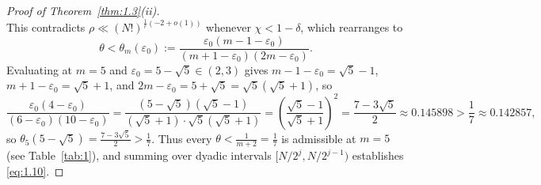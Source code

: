 \documentclass[11pt,reqno]{amsart}
\theoremstyle{remark}
\numberwithin{equation}{section}
\begin{document}
\begin{proof}[Proof of Theorem~\ref{thm:1.3}(ii)]
\[\]
This contradicts $\rho \ll (N!)^{\frac{1}{r}(-2+o(1))}$ whenever $\chi < 1 - \delta$, which rearranges to
\begin{equation}\label{eq:7.18}
\theta < \theta_m(\varepsilon_0) := \frac{\varepsilon_0(m - 1 - \varepsilon_0)}{(m + 1 - \varepsilon_0)(2m - \varepsilon_0)}.
\end{equation}
Evaluating at $m = 5$ and $\varepsilon_0 = 5 - \sqrt{5} \in (2, 3)$ gives $m - 1 - \varepsilon_0 = \sqrt{5} - 1$, $m + 1 - \varepsilon_0 = \sqrt{5} + 1$, and $2m - \varepsilon_0 = 5 + \sqrt{5} = \sqrt{5}(\sqrt{5} + 1)$, so
\[
\frac{\varepsilon_0(4 - \varepsilon_0)}{(6 - \varepsilon_0)(10 - \varepsilon_0)} = \frac{(5 - \sqrt{5})(\sqrt{5} - 1)}{(\sqrt{5} + 1)\cdot\sqrt{5}(\sqrt{5} + 1)} = \left(\frac{\sqrt{5} - 1}{\sqrt{5} + 1}\right)^2 = \frac{7 - 3\sqrt{5}}{2} \approx 0.145898 > \frac{1}{7} \approx 0.142857,
\]
so $\theta_5(5 - \sqrt{5}) = \frac{7 - 3\sqrt{5}}{2} > \frac{1}{7}$. Thus every $\theta < \frac{1}{m+2} = \frac{1}{7}$ is admissible at $m = 5$ (see Table~\ref{tab:1}), and summing over dyadic intervals $[N/2^j, N/2^{j-1})$ establishes \eqref{eq:1.10}.

\begin{table}[!htbp]
\centering
\caption{Progression of unconditional power-saving exponents $\theta$ and upper bounds $O(N^{1-\theta})$ for $\mathcal{N}_{P,s}(N)$ and $\mathcal{N}_{\mathrm{Brocard}}(N)$ under the Support-Reduced Pad\'e--Wronskian method.}\label{tab:1}
\end{table}


\end{proof}
\end{document}
